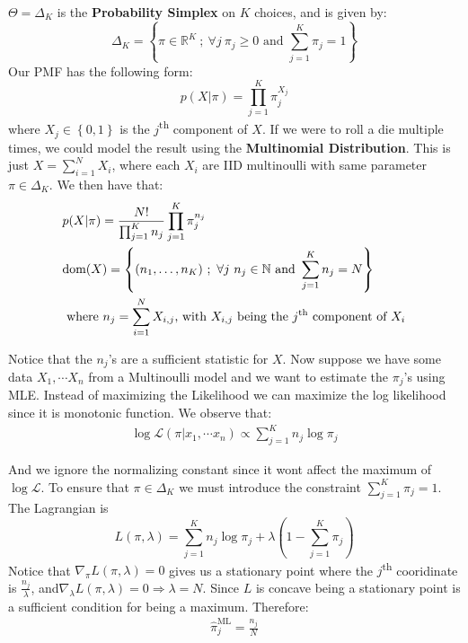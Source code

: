 \documentclass[]{article}
\theoremstyle{mattstyle}
\theoremstyle{definition}
\begin{document}
		
\hfill

$\Theta = \Delta_{K}$ is the \textbf{Probability Simplex} on $K$ choices, and is given by: 
$$\Delta_{K} = \left\{\pi \in \mathbb{R}^{K}\ ;\ \forall j\ \pi_{j} \geq 0 \text{ and } \sum_{j=1}^{K}\pi_{j} = 1\right\}$$
Our PMF has the following form:
$$p(X|\pi) = \prod_{j=1}^{K}\pi_{j}^{X_{j}}$$ where \(X_{j} \in \left\{0,1\right\}\) is the $j$\textsuperscript{th} component of $X$. If we were to roll a die multiple times, we could model the result using the \textbf{Multinomial Distribution}. This is just \(X = \sum_{i=1}^{N}X_{i}\), where each \(X_i\) are IID multinoulli with same parameter $\pi\in\Delta_K$. We then have that:
\begin{align*}
&p(X|\pi) =  \frac{N!}{\prod_{j=1}^{K}n_j}\prod_{j=1}^{K}\pi_{j}^{n_{j}}\\ 
&\text{dom}(X) = \left\{(n_{1},\ldots,n_{K})\ ;\ \forall j\ n_{j} \in \mathbb{N} \text{ and } \sum_{j=1}^{K}n_{j} = N\right\}\\
&\text{ where $n_j = \sum_{i=1}^{N}X_{i,j}$, with $X_{i,j}$ being the $j$\textsuperscript{th} component of $X_i$}
\end{align*}

Notice that the $n_j$'s are a sufficient statistic for $X$. Now suppose we have some data $X_1, \cdots X_n$ from a Multinoulli model and we want to estimate the $\pi_j$'s using MLE. Instead of maximizing the Likelihood we can maximize the log likelihood since it is monotonic function. We observe that:
\begin{align*}
\log \mathcal{L}(\pi|x_1, \cdots x_n) \propto \sum_{j=1}^{K}n_{j}\log \pi_{j}
\end{align*}

And we ignore the normalizing constant since it wont affect the maximum of $\log \mathcal{L}$. To ensure that $\pi \in \Delta_K$ we must introduce the constraint  $\sum_{j=1}^{K}\pi_{j} = 1$. The Lagrangian is
$$L(\pi, \lambda) = \sum_{j=1}^{K}n_{j}\log \pi_{j} + \lambda \left(1 - \sum_{j=1}^{K}\pi_{j}\right)
$$ 
Notice that $\nabla_{\pi}L(\pi, \lambda) = 0$ gives us a stationary point where the $j$\textsuperscript{th} cooridinate is $\frac{n_{j}}{\lambda}$, and$\nabla_{\lambda}L(\pi, \lambda) = 0 \Rightarrow \lambda = N$. Since $L$ is concave being a stationary point is a sufficient condition for being a maximum. Therefore:
\begin{align*}
\boxed{\hat{\pi}_{j}^{\text{ML}} = \frac{n_{j}}{N}}
\label{eq:multinomial-MLE}
\end{align*}
\end{document}
